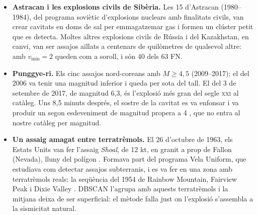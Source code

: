\documentclass[a4paper,11pt]{article}
\begin{document}
\begin{itemize}
        feia servir quan no la podia resoldre. La mitjana del clúster puja a 15,7 km i es perd tot el grup: són 18 dels 63 FN. Dels 63, 10 tenen aquesta profunditat de 33 km.
  \item \textbf{Astracan i les explosions civils de Sibèria.} Les 15 d'Astracan (1980--1984), del programa soviètic d'explosions nuclears amb finalitats civils, van crear cavitats en doms de sal per emmagatzemar gas i formen un clúster petit que es detecta. Moltes altres explosions civils de Rússia i del Kazakhstan, en canvi, van ser assajos aïllats a centenars de quilòmetres de qualsevol altre: amb $v_{\min}=2$ queden com a soroll, i són 40 dels 63 FN.
  \item \textbf{Punggye-ri.} Els cinc assajos nord-coreans amb $M\ge4{,}5$ (2009--2017); el del 2006 va tenir una magnitud
        inferior i queda per sota del tall. El del 3 de setembre de 2017, de magnitud 6,3, és l'explosió més gran del segle
        \textsc{xxi} al catàleg. Uns 8,5 minuts després, el sostre de la cavitat es va enfonsar i va produir un segon
        esdeveniment de magnitud propera a 4 \cite{tian2018}, que no entra al nostre catàleg per magnitud.
  \item \textbf{Un assaig amagat entre terratrèmols.} El 26 d'octubre de 1963, els Estats Units van fer l'assaig \emph{Shoal},
        de 12 kt, en granit a prop de Fallon (Nevada), lluny del polígon \cite{doe2015}. Formava part del programa Vela
        Uniform, que estudiava com detectar assajos subterranis, i es va fer en una zona amb terratrèmols reals: la seqüència
        del 1954 de Rainbow Mountain, Fairview Peak i Dixie Valley \cite{slemmons1957}. DBSCAN l'agrupa amb aquests
        terratrèmols i la mitjana deixa de ser superficial: el mètode falla just on l'explosió s'assembla a la sismicitat natural.
\end{itemize}
\end{document}
